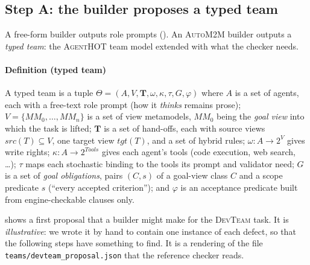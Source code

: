 \documentclass[10pt,a4paper]{article}
\newcommand{\tool}{\textsc{AgentHOT}}
\newcommand{\auto}{\textsc{AutoM2M}}
\newcommand{\Team}{\Theta}
\newcommand{\devteam}{\textsc{DevTeam}}
\newcommand{\MM}{\mathit{MM}}
\newcommand{\file}[1]{\texttt{#1}}
\begin{document}
\subsection{Step A: the builder proposes a typed team}\label{sec:typed}

A free-form builder outputs role prompts (). An \auto{}
builder outputs a \emph{typed team}: the \tool{} team model extended with
what the checker needs.

\paragraph{Definition (typed team)} A typed team is a tuple
$\Team=(A,V,\mathbf{T},\omega,\kappa,\tau,G,\varphi)$ where
$A$ is a set of agents, each with a free-text role prompt (how it
\emph{thinks} remains prose);
$V=\{\MM_0,\dots,\MM_n\}$ is a set of view metamodels, $\MM_0$ being the
\emph{goal view} into which the task is lifted;
$\mathbf{T}$ is a set of hand-offs, each with source views
$\mathit{src}(T)\subseteq V$, one target view $\mathit{tgt}(T)$, and a set
of hybrid rules;
$\omega:A\to 2^V$ gives write rights;
$\kappa:A\to 2^{\mathit{Tools}}$ gives each agent's tools (code execution,
web search, \ldots);
$\tau$ maps each stochastic binding to the tools its prompt and validator
need;
$G$ is a set of \emph{goal obligations}, pairs $(C,s)$ of a goal-view class
$C$ and a scope predicate $s$ (``every accepted criterion'');
and $\varphi$ is an acceptance predicate built from engine-checkable
clauses only.

 shows a first proposal that a builder might make for
the \devteam{} task. It is \emph{illustrative}: we wrote it by hand to
contain one instance of each defect, so that the following steps have
something to find. It is a rendering of the file
\file{teams/devteam_proposal.json} that the reference checker reads.
\end{document}
